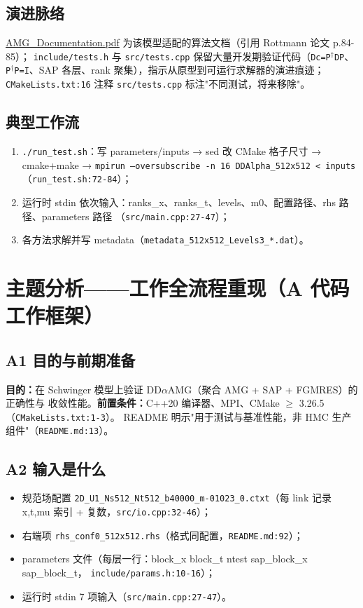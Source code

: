 \documentclass[UTF8]{ctexart}
\begin{document}
\subsection{演进脉络}
\url{AMG_Documentation.pdf} 为该模型适配的算法文档（引用 Rottmann 论文 p.84-85）；
\texttt{\nolinkurl{include/tests.h}} 与 \texttt{\nolinkurl{src/tests.cpp}} 保留大量开发期验证代码（\texttt{Dc=P$^\dagger$DP}、
\texttt{P$^\dagger$P=I}、SAP 各层、rank 聚集），指示从原型到可运行求解器的演进痕迹；
\texttt{\nolinkurl{CMakeLists.txt:16}} 注释 \texttt{\nolinkurl{src/tests.cpp}} 标注"不同测试，将来移除"。

\subsection{典型工作流}
\begin{enumerate}
  \item \texttt{./run\_test.sh}：写 parameters/inputs → sed 改 CMake 格子尺寸 → cmake+make →
        \texttt{mpirun --oversubscribe -n 16 DDAlpha\_512x512 < inputs}（\texttt{run\_test.sh:72-84}）；
  \item 运行时 stdin 依次输入：ranks\_x、ranks\_t、levels、m0、配置路径、rhs 路径、parameters 路径
        （\texttt{\nolinkurl{src/main.cpp:27-47}}）；
  \item 各方法求解并写 metadata（\texttt{metadata\_512x512\_Levels3\_*.dat}）。
\end{enumerate}

\section{主题分析——工作全流程重现（A 代码工作框架）}

\subsection{A1 目的与前期准备}
\textbf{目的：}在 Schwinger 模型上验证 DD$\alpha$AMG（聚合 AMG + SAP + FGMRES）的正确性与
收敛性能。\textbf{前置条件：}C++20 编译器、MPI、CMake $\geq$ 3.26.5（\texttt{CMakeLists.txt:1-3}）。
README 明示"用于测试与基准性能，非 HMC 生产组件"（\texttt{README.md:13}）。

\subsection{A2 输入是什么}
\begin{itemize}
  \item 规范场配置 \texttt{2D\_U1\_Ns512\_Nt512\_b40000\_m-01023\_0.ctxt}（每 link 记录
        x,t,mu 索引 + 复数，\texttt{src/io.cpp:32-46}）；
  \item 右端项 \texttt{rhs\_conf0\_512x512.rhs}（格式同配置，\texttt{README.md:92}）；
  \item parameters 文件（每层一行：block\_x block\_t ntest sap\_block\_x sap\_block\_t，
        \texttt{\nolinkurl{include/params.h:10-16}}）；
  \item 运行时 stdin 7 项输入（\texttt{\nolinkurl{src/main.cpp:27-47}}）。
\end{itemize}
\end{document}
